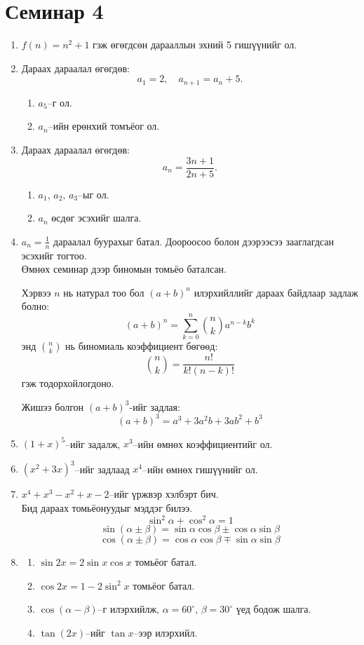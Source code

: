 \section{Семинар 4}
\begin{enumerate}
  \item $f(n)=n^2+1$ гэж өгөгдсөн дарааллын эхний 5 гишүүнийг ол.
  
  \item Дараах дараалал өгөгдөв:
  \[
    a_1=2,\quad a_{n+1}=a_n+5.
  \]
  \begin{enumerate}
    \item $a_5$–г ол.
    \item $a_n$–ийн ерөнхий томъёог ол.
  \end{enumerate}
  
  \item Дараах дараалал өгөгдөв:
  \[
    a_n = \frac{3n+1}{2n+5}.
  \]
  \begin{enumerate}
    \item $a_1$, $a_2$, $a_3$–ыг ол.
    \item $a_n$ өсдөг эсэхийг шалга.
  \end{enumerate}  
  \item $\displaystyle a_n = \frac{1}{n}$ дараалал буурахыг батал. Доороосоо болон дээрээсээ зааглагдсан эсэхийг тогтоо.
\\
Өмнөх семинар дээр биномын томьёо баталсан. 
\begin{theorem}
Хэрвээ $n$ нь натурал тоо бол $(a + b)^n$ илэрхийллийг дараах байдлаар задлаж болно:
\[
(a + b)^n = \sum_{k=0}^{n} \binom{n}{k} a^{n-k} b^k
\]
энд $\binom{n}{k}$ нь биномиаль коэффициент бөгөөд:
\[
\binom{n}{k} = \frac{n!}{k!(n-k)!}
\]
гэж тодорхойлогдоно.
\end{theorem}

\begin{example}
Жишээ болгон $(a + b)^3$-ийг задлая:
\[
(a + b)^3 = a^3 + 3a^2b + 3ab^2 + b^3
\]
\end{example}
\item $(1 + x)^5$–ийг задалж, $x^3$–ийн өмнөх коэффициентийг ол.

\item $(x^2 + 3x)^3$–ийг задлаад $x^4$–ийн өмнөх гишүүнийг ол.

\item $x^4 + x^3 - x^2 + x - 2$–ийг үржвэр хэлбэрт бич.\\
Бид дараах томьёонуудыг мэддэг билээ.
\[\sin^2\alpha+\cos^2\alpha=1 \]
\[
\sin(\alpha \pm \beta) = \sin \alpha \cos \beta \pm \cos \alpha \sin \beta\]
\[\cos(\alpha \pm \beta) = \cos \alpha \cos \beta \mp \sin \alpha \sin \beta
\]
\item 
\begin{enumerate}
\item $\sin 2x = 2 \sin x \cos x$ томьёог батал.
\item $\cos 2x = 1 - 2 \sin^2 x$ томьёог батал.
\item $\cos(\alpha - \beta)$–г илэрхийлж, $\alpha = 60^\circ$, $\beta = 30^\circ$ үед бодож шалга.
\item $\tan(2x)$–ийг $\tan x$–ээр илэрхийл.
\end{enumerate}
\end{enumerate}
\newpage
